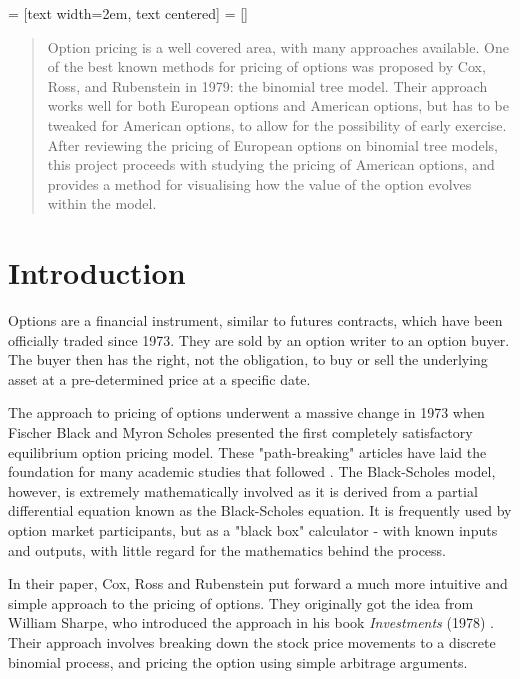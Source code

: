 \documentclass[letterpaper,12pt]{article}
\theoremstyle{plain}
\numberwithin{equation}{section}
\begin{document}
\newpage
{} = [text width=2em, text centered]
 = []


\begin{abstract}
Option pricing is a well covered area, with many approaches available. One of the best known methods for pricing of options was proposed by Cox, Ross, and Rubenstein in 1979: the binomial tree model. Their approach works well for both European options and American options, but has to be tweaked for American options, to allow for the possibility of early exercise. After reviewing the pricing of European options on binomial tree models, this project proceeds with studying the pricing of American options, and provides a method for visualising how the value of the option evolves within the model.
\end{abstract}
\tableofcontents
\doublespacing
\newpage


\section{Introduction}
Options are a financial instrument, similar to futures contracts, which have been officially traded since 1973. They are sold by an option writer to an option buyer. The buyer then has the right, not the obligation, to buy or sell the underlying asset at a pre-determined price at a specific date.

The approach to pricing of options underwent a massive change in 1973 when Fischer Black and Myron Scholes presented the first completely satisfactory equilibrium option pricing model. These "path-breaking" articles have laid the foundation for many academic studies that followed \cite{CRR}. The Black-Scholes model, however, is extremely mathematically involved as it is derived from a partial differential equation known as the Black-Scholes equation. It is frequently used by option market participants, but as a "black box" calculator - with known inputs and outputs, with little regard for the mathematics behind the process.

In their paper, Cox, Ross and Rubenstein \cite{CRR} put forward a much more intuitive and simple approach to the pricing of options. They originally got the idea from William Sharpe, who introduced the approach in his book {\em Investments} (1978) \cite{WSI}. Their approach involves breaking down the stock price movements to a discrete binomial process, and pricing the option using simple arbitrage arguments.
\end{document}
